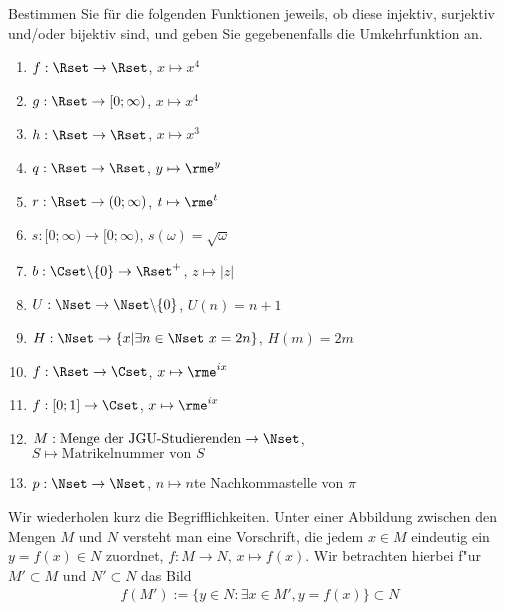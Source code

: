 \documentclass[12pt,answers]{exam}
\begin{document}
\begin{questions}


% 

Bestimmen Sie für die folgenden Funktionen jeweils, ob diese injektiv, surjektiv und/oder bijektiv sind, und geben Sie gegebenenfalls die Umkehrfunktion an.\\
\parbox{0.4\textwidth}{\begin{enumerate}
\item $f:\Rset\to\Rset$, $x\mapsto x^4$
\item $g:\Rset\to[0;\infty)$, $x\mapsto x^4$
\item $h:\Rset\to\Rset$, $x\mapsto x^3$
\item $q:\Rset\to\Rset$, $y\mapsto \rme^y$
\item $r:\Rset\to(0;\infty)$, $t\mapsto \rme^t$
\item $s:[0;\infty)\to[0;\infty)$, $s(\omega)=\sqrt{\omega}$
\item $b:\Cset\backslash\{0\}\to\Rset^+$, $z\mapsto |z|$
\end{enumerate}}\parbox{0.6\textwidth}{\begin{enumerate}\setcounter{enumi}{7}
\item $U:\Nset\to\Nset\backslash\{0\}$, $U(n)=n+1$
\item $H:\Nset\to\{x|\exists n\in\Nset~x=2n\}$, $H(m)=2m$
\item $f:\Rset\to\Cset$, $x\mapsto\rme^{ix}$
\item $f:[0;1]\to\Cset$, $x\mapsto\rme^{ix}$
\item $M: {\textrm{Menge der JGU-Studierenden}}\to \Nset$,\\ $S\mapsto{\textrm{Matrikelnummer von }S}$
\item $p: \Nset\to\Nset$, $n\mapsto n$te Nachkommastelle von $\pi$
\end{enumerate}}
\begin{solution}Wir wiederholen kurz die Begrifflichkeiten. Unter einer Abbildung zwischen den Mengen $M$ und $N$ versteht man eine Vorschrift, die jedem $x\in M$
eindeutig ein $y=f(x)\in N$ zuordnet, $f:M\to N,\, x\mapsto f(x)$. Wir betrachten hierbei f"ur $M'\subset M$ und $N'\subset N$ das Bild
\begin{align*}
f(M'):=\{y\in N:\exists x\in M', y=f(x)\}\subset N
\end{align*}

\end{solution}
\end{questions}
\end{document}
